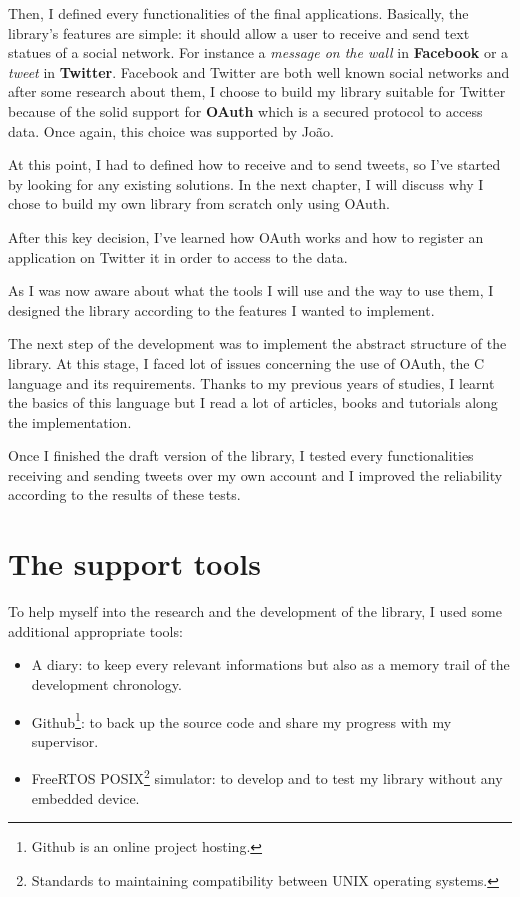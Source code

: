 Then, I defined every functionalities of the final applications. Basically, the library's features are simple: it should allow a user to receive and send text statues of a social network. For instance a \textit{message on the wall} in \textbf{Facebook} or a \textit{tweet} in \textbf{Twitter}. Facebook and Twitter are both well known social networks and after some research about them, I choose to build my library suitable for Twitter because of the solid support for \textbf{OAuth} which is a secured protocol to access data. Once again, this choice was supported by Jo\~{a}o.

At this point, I had to defined how to receive and to send tweets, so I've started by looking for any existing solutions. In the next chapter, I will discuss why I chose to build my own library from scratch only using OAuth.

After this key decision, I've learned how OAuth works and how to register an application on Twitter it in order to access to the data.

As I was now aware about what the tools I will use and the way to use them, I designed the library according to the features I wanted to implement.

The next step of the development was to implement the abstract structure of the library. At this stage, I faced lot of issues concerning the use of OAuth, the C language and its requirements. Thanks to my previous years of studies, I learnt the basics of this language but I read a lot of articles, books and tutorials along the implementation.

Once I finished the draft version of the library, I tested every functionalities receiving and sending tweets over my own account and I improved the reliability according to the results of these tests.



\section{The support tools}

\hspace{15mm}To help myself into the research and the development of the library, I used some additional appropriate tools:
\begin{itemize}
\item A diary: to keep every relevant informations but also as a memory trail of the development chronology.
\item Github\footnote{Github is an online project hosting.}: to back up the source code and share my progress with my supervisor.
\item FreeRTOS POSIX\footnote{Standards to maintaining compatibility between UNIX operating systems.} simulator: to develop and to test my library without any embedded device.
\end{itemize}

\clearpage

